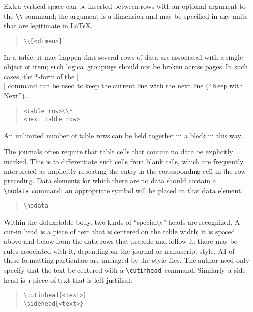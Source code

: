 \documentclass[preprint2]{aastex}
\begin{document}
Extra vertical space can be inserted between rows with an optional argument to the 
\verb"\\" command; the argument is a dimension 
and may be specified in any units that are legitimate in \LaTeX. 
\begin{quote} 
\begin{verbatim} 
\\[<dimen>] 
\end{verbatim} 
\end{quote} 
 
In a table, it may happen that several rows of data are 
associated with a single object or item; 
such logical groupings should not be broken across pages. 
In such cases, the *-form of the |\\| command can be used to 
keep the current line with the next line (``Keep with Next''). 
\begin{quote} 
\begin{verbatim} 
<table row>\\* 
<next table row> 
\end{verbatim} 
\end{quote} 
An unlimited number of table rows can be held together in a block in this way. 
 
The journals often require that table cells that contain  no data 
be explicitly marked.  This is to differentiate such cells from 
blank cells, which are frequently interpreted as implicitly 
repeating the entry in the corresponding cell in the row preceding. 
Data elements for which there are no data should contain 
a \verb"\nodata"\ 
 command; an appropriate symbol will be placed in 
that data element. 
\begin{quote} 
\begin{verbatim} 
\nodata 
\end{verbatim} 
\end{quote} 
 
Within the deluxetable body, two kinds of ``specialty'' heads are 
recognized.  A cut-in head is a piece of text that is centered on the 
table width; 
it is spaced above and below from the data rows that precede and 
follow it; there may be rules associated with it, depending on the 
journal or manuscript style.  All of these formatting particulars 
are managed by the style files.  The author need only specify that the 
text be centered with a \verb"\cutinhead"\ 
 command. 
Similarly, a side head is a piece of text that is left-justified. 
 
\begin{quote} 
\begin{verbatim} 
\cutinhead{<text>} 
\sidehead{<text>} 
\end{verbatim} 
\end{quote} 
 
\end{document}
